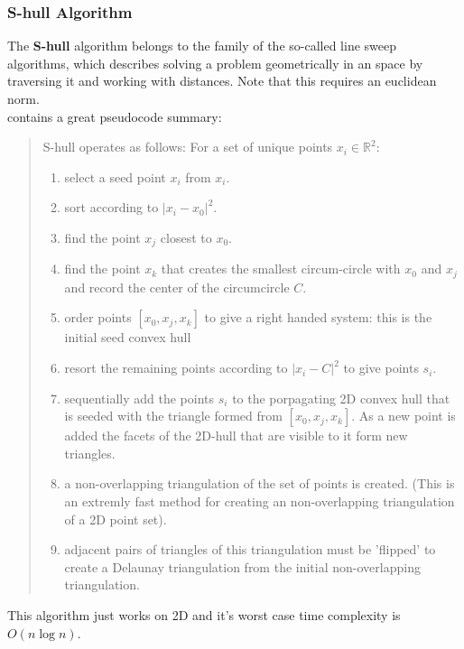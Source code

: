 \subsubsection{S-hull Algorithm}
The \textbf{S-hull} \cite{Sinclair2010} algorithm belongs to the family of the so-called line sweep algorithms, which describes solving a problem geometrically in an space by traversing it and working with distances. Note that this requires an euclidean norm.\\
\cite{Sinclair2010} contains a great pseudocode summary:
\begin{quote}
    S-hull operates as follows: For a set of unique points $x_i \in \mathbb{R}^2$:
    \begin{enumerate}
        \item select a seed point $x_i$ from $x_i$.
        \item sort according to $|x_i - x_0|^2$.
        \item find the point $x_j$ closest to $x_0$.
        \item find the point $x_k$ that creates the smallest circum-circle with $x_0$ and $x_j$ and record the center of the circumcircle $C$.
        \item order points $[x_0, x_j, x_k]$ to give a right handed system: this is the initial seed convex hull
        \item resort the remaining points according to $|x_i-C|^2$ to give points $s_i$.
        \item sequentially add the points $s_i$ to the porpagating 2D convex hull that is seeded with the triangle formed from $[x_0, x_j, x_k]$. As a new point is added the facets of the 2D-hull that are visible to it form new triangles.
        \item a non-overlapping triangulation of the set of points is created. (This is an extremly fast method for creating an non-overlapping triangulation of a 2D point set).
        \item adjacent pairs of triangles of this triangulation must be 'flipped' to create a Delaunay triangulation from the initial non-overlapping triangulation.
    \end{enumerate}
\end{quote}
This algorithm just works on 2D and it's worst case time complexity is $O(n\log n)$. 
